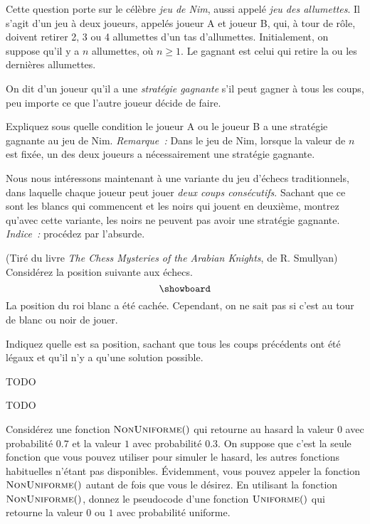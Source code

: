 \documentclass[12pt,addpoints]{exam}
\begin{document}
\begin{questions}

\question
Cette question porte sur le célèbre \emph{jeu de Nim}, aussi appelé \emph{jeu des allumettes}. Il s'agit d'un jeu à deux joueurs, appelés joueur A et joueur B, qui, à tour de rôle, doivent retirer 2, 3 ou 4 allumettes d'un tas d'allumettes. Initialement, on suppose qu'il y a $n$ allumettes, où $n \geq 1$. Le gagnant est celui qui retire la ou les dernières allumettes.

On dit d'un joueur qu'il a une \emph{stratégie gagnante} s'il peut gagner à tous les coups, peu importe ce que l'autre joueur décide de faire.

Expliquez sous quelle condition le joueur A ou le joueur B a une stratégie gagnante au jeu de Nim. \emph{Remarque~:} Dans le jeu de Nim, lorsque la valeur de $n$ est fixée, un des deux joueurs a nécessairement une stratégie gagnante.

\question
Nous nous intéressons maintenant à une variante du jeu d'échecs traditionnels, dans laquelle chaque joueur peut jouer \emph{deux coups consécutifs}. Sachant que ce sont les blancs qui commencent et les noirs qui jouent en deuxième, montrez qu'avec cette variante, les noirs ne peuvent pas avoir une stratégie gagnante. \emph{Indice~:} procédez par l'absurde.

\question
(Tiré du livre \emph{The Chess Mysteries of the Arabian Knights}, de R. Smullyan) Considérez la position suivante aux échecs.
\[ \showboard \]
La position du roi blanc a été cachée. Cependant, on ne sait pas si c'est au tour de blanc ou noir de jouer.

Indiquez quelle est sa position, sachant que tous les coups précédents ont été légaux et qu'il n'y a qu'une solution possible.

%
\question
TODO

%
\question
TODO


\question
Considérez une fonction $\Call{NonUniforme}$ qui retourne au hasard la valeur $0$ avec probabilité $0.7$ et la valeur $1$ avec probabilité $0.3$. On suppose que c'est la seule fonction que vous pouvez utiliser pour simuler le hasard, les autres fonctions habituelles n'étant pas disponibles. Évidemment, vous pouvez appeler la fonction $\Call{NonUniforme}$ autant de fois que vous le désirez. En utilisant la fonction $\Call{NonUniforme}$, donnez le pseudocode d'une fonction $\Call{Uniforme}$ qui retourne la valeur $0$ ou $1$ avec probabilité uniforme.
\begin{solution}
\end{solution}


\end{questions}
\end{document}
